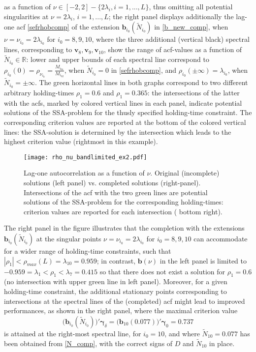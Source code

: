 \documentclass[a4paper]{article}
\begin{document}
as a function of $\nu\in [-2,2]-\{2\lambda_i, i=1,...,L\}$, thus omitting all potential singularities at $\nu=2\lambda_i$, $i=1,...,L$; the right panel displays additionally the lag-one acf \ref{sefrhobcomp} of the extension $\mathbf{b}_{i_0}(\tilde{N}_{i_0})$ in  \ref{b_new_comp}, when $\nu=\nu_{i_0}=2\lambda_{i_0}$ for $i_0=8,9,10$, where the three additional (vertical black) spectral lines, corresponding to $\mathbf{v}_{8},\mathbf{v}_{9},\mathbf{v}_{10}$, show the range of acf-values as a function of $\tilde{N}_{i_0}\in\mathbb{R}$: lower and upper bounds of each spectral line correspond to $\rho_{i_0}(0)=\rho_{\nu_{i_0}}=\frac{M_{i_01}}{M_{i_02}}$, when $\tilde{N}_{i_0}=0$ in \ref{sefrhobcomp}, and $\rho_{i_0}(\pm\infty)=\lambda_{i_0}$, when $\tilde{N}_{i_0}=\pm\infty$. The green horizontal lines in both graphs correspond to two different arbitrary holding-times $\rho_1=0.6$ and $\rho_1=0.365$: the intersections of the latter with the acfs, marked by colored vertical lines in each panel, indicate potential solutions of the SSA-problem for the thusly specified  holding-time constraint. The corresponding criterion values are reported at the bottom of the colored vertical lines: the SSA-solution is determined by the intersection which leads to the highest criterion value (rightmost in this example). %
\begin{figure}[H]\begin{center}\texttt{[image: rho\_nu\_bandlimited\_ex2.pdf]}\caption{Lag-one autocorrelation  as a function of $\nu$. Original (incomplete) solutions (left panel) vs. completed solutions (right-panel). Intersections of the acf with the two green lines are potential solutions of the SSA-problem for the corresponding holding-times: criterion values are reported for each intersection ( bottom right).\label{rho_nu_bandlimited_ex2}}\end{center}\end{figure}The right panel in the figure illustrates that the completion with the extensions $\mathbf{b}_{i_0}(\tilde{N}_{i_0})$ at the singular points $\nu=\nu_{i_0}=2\lambda_{i_0}$ for $i_0=8,9,10$ can accommodate for a wider range of holding-time constraints, such that $|\rho_1|<\rho_{max}(L)=\lambda_{10}=0.959$; in contrast, $\mathbf{b}(\nu)$ in the left panel is limited to $-0.959=\lambda_1<\rho_1<\lambda_7=0.415$ so that there does not exist a solution for $\rho_1=0.6$ (no intersection with upper green line in left panel). Moreover, for a given holding-time constraint, the additional stationary points corresponding to intersections at the spectral lines of the (completed) acf might lead to improved performances, as shown in the right panel, where the maximal criterion value \[
\Big(\mathbf{b}_{i_0}(\tilde{N}_{i_0})\Big)'\boldsymbol{\gamma}_{\delta}=\Big(\mathbf{b}_{10}(0.077)\Big)'\boldsymbol{\gamma}_{0}=0.737
\] 
is attained at the right-most spectral line, for $i_0=10$, and where $\tilde{N}_{10}=0.077$ has been obtained from \ref{N_comp}, with the correct signs of $D$ and $\tilde{N}_{10}$ in place. \\
\end{document}
